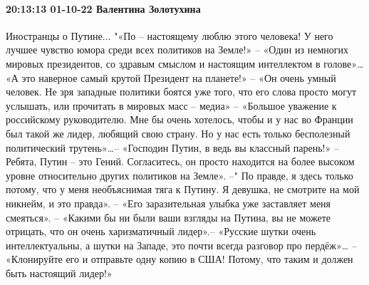 \paragraph{20:13:13 01-10-22 Валентина Золотухина}

Иностранцы о Путине... "«По – настоящему люблю этого человека! У него лучшее
чувство юмора среди всех политиков на Земле!» – «Один из немногих мировых
президентов, со здравым смыслом и настоящим интеллектом в голове»… «А это
наверное самый крутой Президент на планете!» – «Он очень умный человек. Не зря
западные политики боятся уже того, что его слова просто могут услышать, или
прочитать в мировых масс – медиа» – «Большое уважение к российскому
руководителю. Мне бы очень хотелось, чтобы и у нас во Франции был такой же
лидер, любящий свою страну. Но у нас есть только бесполезный политический
трутень»…– «Господин Путин, в ведь вы классный парень!» – Ребята, Путин – это
Гений. Согласитесь, он просто находится на более высоком уровне относительно
других политиков на Земле». –" По правде, я здесь только потому, что у меня
необъяснимая тяга к Путину. Я девушка, не смотрите на мой никнейм, и это
правда». – «Его заразительная улыбка уже заставляет меня смеяться». – «Какими
бы ни были ваши взгляды на Путина, вы не можете отрицать, что он очень
харизматичный лидер».– «Русские шутки очень интеллектуальны, а шутки на Западе,
это почти всегда разговор про пердёж»… – «Клонируйте его и отправьте одну копию
в США! Потому, что таким и должен быть настоящий лидер!»








